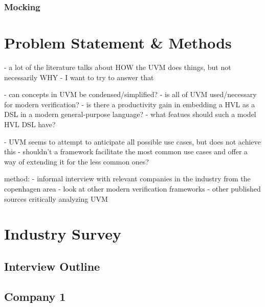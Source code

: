 \documentclass[12pt]{report}
\begin{document}
\subsection{Mocking} %

\chapter{Problem Statement \& Methods} %

- a lot of the literature talks about HOW the UVM does things, but not necessarily WHY
- I want to try to answer that

- can concepts in UVM be condensed/simplified?
- is all of UVM used/necessary for modern verification?
- is there a productivity gain in embedding a HVL as a DSL in a modern general-purpose language?
- what featues should such a model HVL DSL have?

- UVM seems to attempt to anticipate all possible use cases, but does not achieve this
- shouldn't a framework facilitate the most common use cases and offer a way of extending it for the less common ones?

method:
- informal interview with relevant companies in the industry from the copenhagen area
- look at other modern verification frameworks
- other published sources critically analyzing UVM

\chapter{Industry Survey} %

\section{Interview Outline} %

\section{Company 1} %
\end{document}
